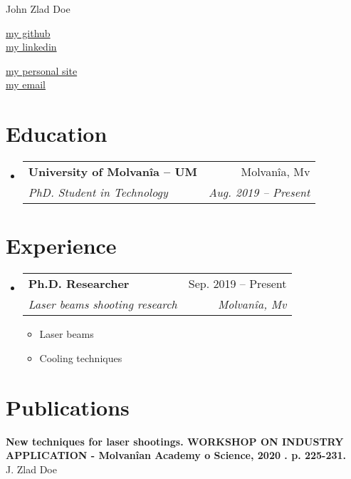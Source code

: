 \documentclass[letterpaper,10pt]{article}
\makeatletter
\newcommand{\resumeItem}[1]{
  \item\small{
    {#1 \vspace{-2pt}}
  }
}
\newcommand{\resumeSubheading}[4]{
  \vspace{-2pt}\item
    \begin{tabular*}{0.97\textwidth}[t]{l@{\extracolsep{\fill}}r}
      \textbf{#1} & #2 \\
      \textit{\small#3} & \textit{\small #4} \\
    \end{tabular*}\vspace{-7pt}
}
\newcommand{\resumeSubHeadingListStart}{\begin{itemize}[leftmargin=0.15in, label={}]}
\newcommand{\resumeSubHeadingListEnd}{\end{itemize}}
\newcommand{\resumeItemListStart}{\begin{itemize}}
\newcommand{\resumeItemListEnd}{\end{itemize}\vspace{-5pt}}
\makeatother
\begin{document}
\begin{center}
    {\LARGE John Zlad Doe} \\ \vspace{2pt}
    \begin{multicols}{2}
    \begin{flushleft}
    \href{github}{my github}\\
    \href{linkedin}{my linkedin}
    \end{flushleft}
    
    \begin{flushright}
    \href{personal}{my personal site}\\
    \href{mailto:email}{my email}
    \end{flushright}
    \end{multicols}
\end{center}


\vspace{-2pt}
\section{Education}
  \resumeSubHeadingListStart
      \resumeSubheading
      {University of Molvanîa -- UM}{Molvanîa, Mv}
      {PhD. Student in Technology}{Aug. 2019 -- Present}

  \resumeSubHeadingListEnd


\section{Experience}
  \resumeSubHeadingListStart
    \resumeSubheading
      {Ph.D. Researcher}{Sep. 2019 -- Present}
      {Laser beams shooting research}{Molvanîa, Mv}
      \resumeItemListStart
        \resumeItem{Laser beams}
        \resumeItem{Cooling techniques}
    \resumeItemListEnd

  \resumeSubHeadingListEnd

\section{Publications}
 \begin{itemize}[leftmargin=0.15in, label={}]
    \small{\item{
    \textbf{New techniques for laser shootings. WORKSHOP ON INDUSTRY APPLICATION - Molvanîan Academy o Science, 2020 . p. 225-231.}{\\J. Zlad Doe}\\
\ 
}}
 \end{itemize}
\end{document}
